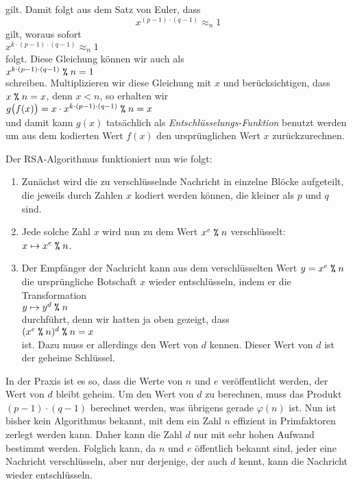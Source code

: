 gilt.  Damit folgt aus dem Satz von Euler, dass
\begin{equation}
  \label{eq:rsa3}
  x^{(p-1) \cdot (q-1)} \approx_n 1
\end{equation}
gilt, woraus sofort 
\\[0.2cm]
\hspace*{1.3cm}
$x^{k \cdot (p-1) \cdot (q-1)} \approx_n 1$
\\[0.2cm]
folgt.  Diese Gleichung können wir auch als
\\[0.2cm]
\hspace*{1.3cm}
$x^{k \cdot (p-1) \cdot (q-1)} \;\texttt{\%}\; n = 1$
\\[0.2cm]
schreiben.  Multiplizieren wir diese Gleichung mit $x$ und berücksichtigen, dass $x \;\texttt{\%}\; n = x$, denn
$x < n$, so erhalten wir
\\[0.2cm]
\hspace*{1.3cm}
$g\bigl(f(x)\bigr) = x \cdot x^{k \cdot (p-1) \cdot (q-1)} \;\texttt{\%}\; n = x$
\\[0.2cm]
und damit kann $g(x)$ tatsächlich als \emph{Entschlüsselungs-Funktion} benutzt werden um aus dem 
kodierten Wert $f(x)$ den ursprünglichen Wert $x$ zurückzurechnen.
\vspace*{0.3cm}

Der RSA-Algorithmus funktioniert nun wie folgt: 
\begin{enumerate}
\item Zunächst wird die zu verschlüsselnde Nachricht in einzelne Blöcke aufgeteilt, die
      jeweils durch Zahlen $x$ kodiert werden können, die kleiner als $p$ und $q$ sind.
\item Jede solche Zahl $x$ wird nun zu dem Wert $x^e \;\texttt{\%}\; n$ verschlüsselt:
      \\[0.2cm]
      \hspace*{1.3cm}
      $x \mapsto x^e \;\texttt{\%}\; n$.
\item Der Empfänger der Nachricht kann aus dem verschlüsselten Wert $y = x^e \;\texttt{\%}\; n$ die
      ursprüngliche Botschaft $x$ wieder entschlüsseln, indem er die Transformation
      \\[0.2cm]
      \hspace*{1.3cm}
      $y \mapsto y^d \;\texttt{\%}\; n$
      \\[0.2cm]
      durchführt, denn wir hatten ja oben gezeigt, dass
      \\[0.2cm]
      \hspace*{1.3cm}
      $(x^e \;\texttt{\%}\; n)^d \;\texttt{\%}\; n = x$
      \\[0.2cm]
      ist.  Dazu muss er allerdings den Wert von $d$ kennen.  Dieser Wert von $d$ ist der geheime Schlüssel.
\end{enumerate}
In der Praxis ist es so, dass die Werte von $n$ und $e$ veröffentlicht werden, der Wert
von $d$ bleibt geheim.   Um den Wert von $d$ zu berechnen, muss das Produkt 
$(p-1) \cdot (q-1)$ berechnet werden, was übrigens gerade $\varphi(n)$ ist.  Nun ist
bisher kein Algorithmus bekannt, mit dem ein Zahl $n$ effizient in Primfaktoren zerlegt
werden kann.  Daher kann die Zahl $d$ nur mit sehr hohen Aufwand bestimmt werden.
Folglich kann, da $n$ und $e$ öffentlich bekannt sind, jeder eine Nachricht verschlüsseln,
aber nur derjenige, der auch $d$ kennt, kann die Nachricht wieder entschlüsseln.


